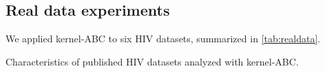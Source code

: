 \subsection{Real data experiments}

We applied kernel-\gls{ABC} to six \gls{HIV} datasets, summarized in
\cref{tab:realdata}.

\begin{table}
  \centering
  
  \caption{Characteristics of published HIV datasets analyzed with kernel-ABC.}
  \label{tab:realdata}
\end{table}
